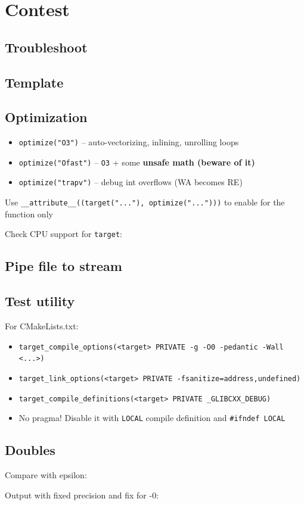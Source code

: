 \section{Contest}

\subsection{Troubleshoot}


\subsection{Template}

\subsection{Optimization}

\vspace{0.5em}
\begin{itemize}
  \item \verb|optimize("O3")| -- auto-vectorizing, inlining, unrolling loops
  \item \verb|optimize("Ofast")| -- \verb|O3| + some \bf{unsafe} math (beware of it)
  \item \verb|optimize("trapv")| -- debug int overflows (WA becomes RE)
\end{itemize}

Use \verb|__attribute__((target("..."), optimize("...")))| to enable for the function only

\vspace{0.2em}
Check CPU support for \verb|target|:


\subsection{Pipe file to stream}

\subsection{Test utility}

For CMakeLists.txt:
\vspace{0.6em}
\begin{itemize}
  \item \verb|target_compile_options(<target> PRIVATE -g -O0 -pedantic -Wall <...>)|
  \item \verb|target_link_options(<target> PRIVATE -fsanitize=address,undefined)|
  \item \verb|target_compile_definitions(<target> PRIVATE _GLIBCXX_DEBUG)|
  \item No pragma! Disable it with \verb|LOCAL| compile definition and \verb|#ifndef LOCAL|
\end{itemize}

\subsection{Doubles}

Compare with epsilon:

Output with fixed precision and fix for -0:
